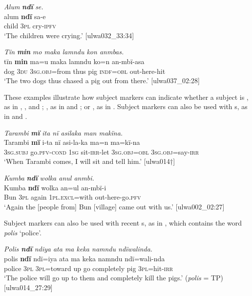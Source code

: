 \ea%
    \label{ex:det:6}
            \textit{Alum} \textbf{\textit{ndï}} \textit{se.}\\
\gll    alum  \textbf{ndï}   sa{}-e\\
    child  3\textsc{pl}    cry-\textsc{ipfv}\\
\glt `The children were crying.’  [ulwa032\_33:34]
\z

\ea%
    \label{ex:det:7}
            \textit{Tïn} \textbf{\textit{min}} \textit{mo maka lamndu kon anmbas.}\\
\gll    tïn    \textbf{min}  ma=u      maka  lamndu  ko=n an-mbï-asa\\
    dog  3\textsc{du}  3\textsc{sg.obj}=from  thus  pig      \textsc{indf}=\textsc{obl}    out-here-hit\\
\glt `The two dogs thus chased a pig out from there.’ [ulwa037\_02:28]
\z

These examples illustrate how subject markers can indicate whether a  subject is , as in , , and ; , as in  and ; or , as in . Subject markers can also be used with s, as in  and .

\ea%
    \label{ex:det:8}
            \textit{Tarambi} \textbf{\textit{mï}} \textit{ita nï asilaka man makïna.}\\
\gll    Tarambi  \textbf{mï}       i-ta        nï    asi-la-ka  ma=n ma=kï-na\\
    [name]    3\textsc{sg.subj}  go.\textsc{pfv-cond}  1\textsc{sg}  sit-\textsc{irr}{}-let  3\textsc{sg.obj=obl}    3\textsc{sg.obj}=say-\textsc{irr}\\
\glt `When Tarambi comes, I will sit and tell him.’ [ulwa014†]
\z

\ea%
    \label{ex:det:9}
            \textit{Kumba} \textbf{\textit{ndï}} \textit{wolka anul anmbi.}\\
\gll    Kumba  \textbf{ndï}  wolka  an=ul        an-mbï-i\\
    Bun  3\textsc{pl}  again  1\textsc{pl.excl}=with  out-here-go.\textsc{pfv}\\
\glt `Again the [people from] Bun [village] came out with us.’ [ulwa002\_02:27]
\z

Subject markers can also be used with recent s, as in , which contains the  word \textit{polis} ‘police’.

\ea%
    \label{ex:det:10}
          \textit{Polis \textbf{ndï} ndiya ata ma keka namndu ndïwalinda.}\\
\gll    polis  \textbf{ndï}  ndï=iya    ata  ma  keka      namndu ndï=wali-nda\\
    police  3\textsc{pl}  3\textsc{pl}=toward  up  go  completely  pig    3\textsc{pl}=hit-\textsc{irr}\\
\glt `The police will go up to them and completely kill the pigs.’ (\textit{polis} = TP) [ulwa014\_27:29]
\z

